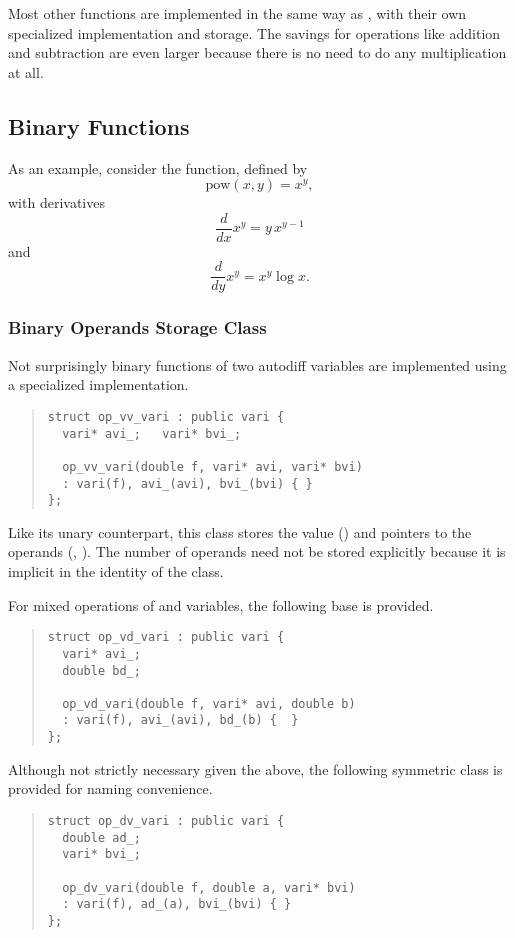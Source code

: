 \documentclass[10pt]{article}
\begin{document}
Most other functions are implemented in the same way as ,
with their own specialized  implementation and storage.
The savings for operations like addition and subtraction are even
larger because there is no need to do any multiplication at all.

\subsection{Binary Functions}

As an example, consider the  function, defined by
\[
\mbox{pow}(x,y) = x^y,
\]
with derivatives
\[
\frac{d}{dx} x^y = y \, x^{y-1}
\]
and
\[
\frac{d}{dy} x^y = x^y \log x.
\]


\subsubsection{Binary Operands Storage Class}

Not surprisingly binary functions of two autodiff variables are
implemented using a specialized  implementation.
%
\begin{quote}
\begin{Verbatim}
struct op_vv_vari : public vari {
  vari* avi_;   vari* bvi_;

  op_vv_vari(double f, vari* avi, vari* bvi)
  : vari(f), avi_(avi), bvi_(bvi) { }
};
\end{Verbatim}
\end{quote}
%
Like its unary counterpart, this class stores the value () and
pointers to the operands (, ).  The number of
operands need not be stored explicitly because it is implicit in the
identity of the class. 

For mixed operations of  and  variables, the
following base  is provided.
%
\begin{quote}
\begin{Verbatim}
struct op_vd_vari : public vari {
  vari* avi_;
  double bd_;

  op_vd_vari(double f, vari* avi, double b)
  : vari(f), avi_(avi), bd_(b) {  }
};
\end{Verbatim}
\end{quote}
%
Although not strictly necessary given the above, the following
symmetric class is provided for naming convenience.
%
\begin{quote}
\begin{Verbatim}
struct op_dv_vari : public vari {
  double ad_;
  vari* bvi_;

  op_dv_vari(double f, double a, vari* bvi)
  : vari(f), ad_(a), bvi_(bvi) { }
};
\end{Verbatim}
\end{quote}
%
\end{document}
